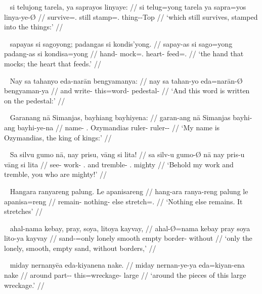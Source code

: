 \ex~\begingl
	\gla si telujong tarela, ya saprayos linyaye: //
	\glb si telug=yong tarela ya sapra=yos linya-ye-Ø //
	\glc \Rel{} survive=\TsgN{}.\Aarg{} still \LocT{} stamp=\TsgN{}.\Parg{} 
		thing-\Pl{}-Top{} //
	\glft `which still survives, stamped into the things:' //
\endgl\xe

\ex~\begingl
	\gla sapayas si sagoyong; padangas si kondis'yong. //
	\glb sapay-as si sago=yong padang-as si kondisa=yong //
	\glc hand-\Parg{} \Rel{} mock=\TsgN{}.\Aarg{} heart-\Parg{} \Rel{} 
		feed=\TsgN{}.\Aarg{} //
	\glft `the hand that mocks; the heart that feeds.' //
\endgl\xe

\ex~\begingl
	\gla Nay sa tahanyo eda-narān bengyamanya: //
	\glb nay sa tahan-yo eda=narān-Ø bengyaman-ya //
	\glc and \PatT{} write-\TsgN{} this=word-\Top{} pedestal-\Loc{} //
	\glft `And this word is written on the pedestal:' //
\endgl\xe

\ex~\begingl
	\gla Garanang nā Simanjas, bayhiang bayhiyena: //
	\glb garan-ang nā Simanjas bayhi-ang bayhi-ye-na //
	\glc name-\Aarg{} \Fsg{}.\Gen{} Ozymandias ruler-\Aarg{} 
			ruler-\Pl{}-\Gen{} //
	\glft `My name is Ozymandias, the king of kings:' //
\endgl\xe

\ex~\begingl
	\gla Sa silvu gumo nā, nay prisu, vāng si lita! //
	\glb sa silv-u gumo-Ø nā nay pris-u vāng si lita //
	\glc \PatT{} see-\Imp{} work-\Top{} \Fsg{}.\Gen{} and tremble-\Imp{}
		\Second{}.\Aarg{} \Rel{} mighty //
	\glft `Behold my work and tremble, you who are mighty!' //
\endgl\xe

\ex~\begingl
	\gla Hangara ranyareng palung. Le apanisareng //
	\glb hang-ara ranya-reng palung le apanisa=reng //
	\glc remain-\TsgI{} nothing-\AargI{} else \PatTI{} 
		stretch=\TsgI{}.\Aarg{} //
	\glft `Nothing else remains. It stretches' //
\endgl\xe

\ex~\begingl
	\gla ahal-nama kebay, pray, soya, litoya kayvay, //
	\glb ahal-Ø=nama kebay pray soya lito-ya kayvay //
	\glc sand-\Top{}=only lonely smooth empty border-\Top{} without //
	\glft `only the lonely, smooth, empty sand, without borders,' //
\endgl\xe

\ex~\begingl
	\gla miday nernanyēa eda-kiyanena nake. //
	\glb miday nernan-ye-ya eda=kiyan-ena nake //
	\glc around part-\Pl{}-\Loc{} this=wreckage-\Gen{} large //
	\glft `around the pieces of this large wreckage.' //
\endgl\xe

